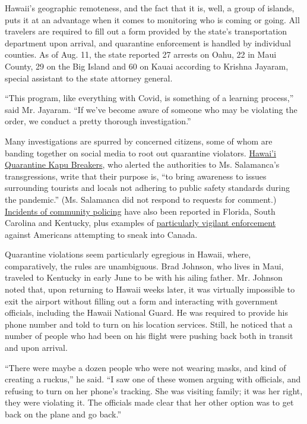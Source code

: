 Hawaii's geographic remoteness, and the fact that it is, well, a group
of islands, puts it at an advantage when it comes to monitoring who is
coming or going. All travelers are required to fill out a form provided
by the state's transportation department upon arrival, and quarantine
enforcement is handled by individual counties. As of Aug. 11, the state
reported 27 arrests on Oahu, 22 in Maui County, 29 on the Big Island and
60 on Kauai according to Krishna Jayaram, special assistant to the state
attorney general.

``This program, like everything with Covid, is something of a learning
process,'' said Mr. Jayaram. ``If we've become aware of someone who may
be violating the order, we conduct a pretty thorough investigation.''

Many investigations are spurred by concerned citizens, some of whom are
banding together on social media to root out quarantine violators.
\href{https://www.facebookcorewwwi.onion/groups/KapuBreakers}{Hawai'i
Quarantine Kapu Breakers}, who alerted the authorities to Ms.
Salamanca's transgressions, write that their purpose is, ``to bring
awareness to issues surrounding tourists and locals not adhering to
public safety standards during the pandemic.'' (Ms. Salamanca did not
respond to requests for comment.)
\href{https://www.washingtonpost.com/nation/2020/07/31/arrest-breaking-quarantine-covid-florida/}{Incidents
of community policing} have also been reported in Florida, South
Carolina and Kentucky, plus examples of
\href{https://www.nytimes3xbfgragh.onion/2020/08/07/travel/Canada-border-crossings-coronavirus.html}{particularly
vigilant enforcement} against Americans attempting to sneak into Canada.

Quarantine violations seem particularly egregious in Hawaii, where,
comparatively, the rules are unambiguous. Brad Johnson, who lives in
Maui, traveled to Kentucky in early June to be with his ailing father.
Mr. Johnson noted that, upon returning to Hawaii weeks later, it was
virtually impossible to exit the airport without filling out a form and
interacting with government officials, including the Hawaii National
Guard. He was required to provide his phone number and told to turn on
his location services. Still, he noticed that a number of people who had
been on his flight were pushing back both in transit and upon arrival.

``There were maybe a dozen people who were not wearing masks, and kind
of creating a ruckus,'' he said. ``I saw one of these women arguing with
officials, and refusing to turn on her phone's tracking. She was
visiting family; it was her right, they were violating it. The officials
made clear that her other option was to get back on the plane and go
back.''

